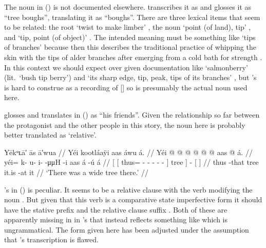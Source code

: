 The noun  in (\lastx) is not documented elsewhere.
\citeauthor{swanton:1909} transcribes it as  and glosses it as “tree boughs”, translating it as “boughs”.
There are three lexical items that seem to be related: the root  ‘twist to make limber’ \parencite[f04/1–2]{leer:1973}, the noun  ‘point (of land), tip’ \parencite[f04/3–5]{leer:1973}, and  ‘tip, point (of object)’ \parencite[f04/8]{leer:1973}.
The intended meaning must be something like ‘tips of branches’ because then this describes the traditional practice of whipping the skin with the tips of alder branches after emerging from a cold bath for strength \parencites[516–517]{de-laguna:1972}[300]{mcclellan:1975a}[358]{mcclellan:1975b}[335]{emmons:1991}.
In this context we should expect  over  given documentation like  ‘salmonberry’ (lit.\ ‘bush tip berry’) and  ‘its sharp edge, tip, peak, tips of its branches’ \parencite[f04/8]{leer:1973}, but \citeauthor{swanton:1909}’s  is hard to construe as a recording of [] so  is presumably the actual noun used here.

\citeauthor{swanton:1909} glosses and translates  in (\lastx) as “his friends”.
Given the relationship so far between the protagonist and the other people in this story, the noun  here is probably better translated as ‘relative’.

\ex\label{ex:93-14-thick-tree}%
%
\begingl
	\glpreamble	Yēkᵘʟā′ ās ā′wua //
	\glpreamble	Yéi kootláaÿi aas áwu á. //
	\gla	{} {} Yéi @  @ {} @ {} @ {} @ {} @ {} {} aas {}
		 @ {}
		{} á. {} //
	\glb	{} {} yéi= k- u- i-  -μμH -i {} aas {}
		á -ú
		{} á {} //
	\glc	{}[ {}[ thus= - - -  - - {}] tree {}]
		 -
		{}[  {}] //
	\gld	{} {} thus  {} {} {} {} -that {} tree {} 
		it.is -at
		{} it {} //
	\glft	‘There was a wide tree there.’
		//
\endgl
\xe

\citeauthor{swanton:1909}’s  in (\lastx) is peculiar.
It seems to be a relative clause with the verb modifying the noun .
But given that this verb is a comparative state imperfective form it should have the stative prefix  and the relative clause suffix .
Both of these are apparently missing in in \citeauthor{swanton:1909}’s  that instead reflects something like  which is ungrammatical.
The form given here has been adjusted under the assumption that \citeauthor{swanton:1909}’s transcription is flawed.


